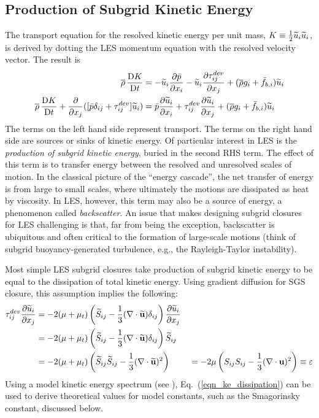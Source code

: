 \subsection{Production of Subgrid Kinetic Energy}

The transport equation for the resolved kinetic energy per unit mass, $K\equiv \mbox{$\frac{1}{2}$} \widetilde{u}_i\widetilde{u}_i$, is derived by dotting the LES momentum equation with the resolved velocity vector.  The result is
\begin{align}
\label{eqn_LES_KE}
\overline{\rho} \,\frac{\mathrm{D} K}{\mathrm{D} t} &= -\widetilde{u}_i\frac{\partial \bar{p}}{\partial x_i} - \widetilde{u}_i\frac{\partial \tau_{ij}^{dev}}{\partial x_j} + (\overline{\rho} g_i + \bar{f}_{b,i}) \widetilde{u}_i \notag \\
\overline{\rho} \,\frac{\mathrm{D} K}{\mathrm{D} t} + \frac{\partial}{\partial x_j} ([\bar{p}\delta_{ij} + \tau_{ij}^{dev}]\widetilde{u}_i) &=  \bar{p} \frac{\partial \widetilde{u}_i}{\partial x_i} + \tau_{ij}^{dev}\frac{\partial \widetilde{u}_i}{\partial x_j} + (\overline{\rho} g_i + \bar{f}_{b,i}) \widetilde{u}_i
\end{align}
The terms on the left hand side represent transport.  The terms on the right hand side are sources or sinks of kinetic energy.  Of particular interest in LES is the \emph{production of subgrid kinetic energy}, buried in the second RHS term.  The effect of this term is to transfer energy between the resolved and unresolved scales of motion.  In the classical picture of the ``energy cascade'', the net transfer of energy is from large to small scales, where ultimately the motions are dissipated as heat by viscosity.  In LES, however, this term may also be a source of energy, a phenomenon called \emph{backscatter}.  An issue that makes designing subgrid closures for LES challenging is that, far from being the exception, backscatter is ubiquitous and often critical to the formation of large-scale motions (think of subgrid buoyancy-generated turbulence, e.g., the Rayleigh-Taylor instability).

Most simple LES subgrid closures take production of subgrid kinetic energy to be equal to the dissipation of total kinetic energy.  Using gradient diffusion for SGS closure, this assumption implies the following:
\begin{align}
\label{eqn_ke_dissipation}
\tau_{ij}^{dev}\frac{\partial \widetilde{u}_i}{\partial x_j} &= - 2 (\mu + \mu_t) \left(\widetilde{S}_{ij} - \frac{1}{3}(\nabla\cdot \widetilde{\mathbf{u}}) \delta_{ij} \right) \frac{\partial \widetilde{u}_i}{\partial x_j} && \notag\\
&= - 2 (\mu + \mu_t) \left(\widetilde{S}_{ij} - \frac{1}{3}(\nabla\cdot \widetilde{\mathbf{u}}) \delta_{ij} \right) \widetilde{S}_{ij} && \notag \\
&= - 2 (\mu + \mu_t) \left(\widetilde{S}_{ij}\widetilde{S}_{ij} - \frac{1}{3}(\nabla\cdot \widetilde{\mathbf{u}})^2 \right) && = -2\mu \left(S_{ij}S_{ij} - \frac{1}{3}(\nabla\cdot \mathbf{u})^2 \right) \equiv \varepsilon
\end{align}
Using a model kinetic energy spectrum (see \cite{Pope:2000}), Eq.~(\ref{eqn_ke_dissipation}) can be used to derive theoretical values for model constants, such as the Smagorinsky constant, discussed below.

